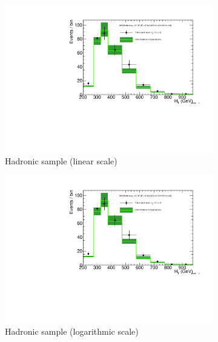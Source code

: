 \clearpage
\begin{figure}[h!]
  \centering
  \begin{subfigure}[b]{0.48\textwidth}
    \includegraphics[width=\textwidth,page=1]
    {Figs/results/v0/greenBand/bestFit_2012dev_RQcdZero_fZinvAll_2b_ge4j-1_smOnly}
    \caption{Hadronic sample (linear scale)}
  \end{subfigure}
  \begin{subfigure}[b]{0.48\textwidth}
    \includegraphics[width=\textwidth,page=2]
    {Figs/results/v0/greenBand/bestFit_2012dev_RQcdZero_fZinvAll_2b_ge4j-1_smOnly}
    \caption{Hadronic sample (logarithmic scale)}
  \end{subfigure}
  \begin{subfigure}[b]{0.48\textwidth}

\end{subfigure}
\end{figure}
